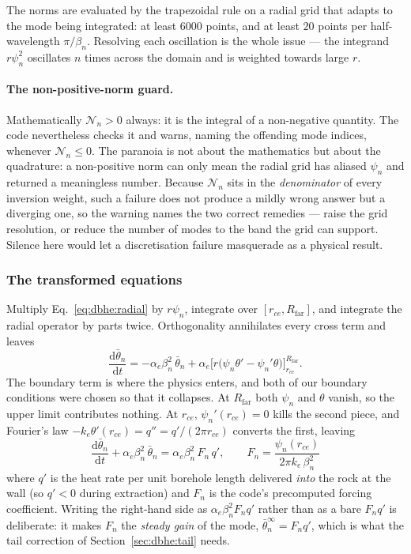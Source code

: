 \documentclass[11pt]{article}
\begin{document}
The norms are evaluated by the trapezoidal rule on a radial grid that adapts to
the mode being integrated: at least $6000$ points, and at least $20$ points per
half-wavelength $\pi/\beta_n$. Resolving each oscillation is the whole issue ---
the integrand $r\psi_n^2$ oscillates $n$ times across the domain and is weighted
towards large $r$.

\paragraph{The non-positive-norm guard.}
Mathematically $\mathcal{N}_n>0$ always: it is the integral of a non-negative
quantity. The code nevertheless checks it and warns, naming the offending mode
indices, whenever $\mathcal{N}_n\le0$. The paranoia is not about the mathematics
but about the quadrature: a non-positive norm can only mean the radial grid has
aliased $\psi_n$ and returned a meaningless number. Because $\mathcal{N}_n$ sits
in the \emph{denominator} of every inversion weight, such a failure does not
produce a mildly wrong answer but a diverging one, so the warning names the two
correct remedies --- raise the grid resolution, or reduce the number of modes to
the band the grid can support. Silence here would let a discretisation failure
masquerade as a physical result.

\subsubsection{The transformed equations}
Multiply Eq.~\eqref{eq:dbhe:radial} by $r\psi_n$, integrate over
$[r_{ce},R_{\mathrm{far}}]$, and integrate the radial operator by parts twice.
Orthogonality annihilates every cross term and leaves
\begin{equation}
\frac{\mathrm{d}\bar\theta_n}{\mathrm{d}t} =-\alpha_e\beta_n^{2}\,\bar\theta_n
+\alpha_e\Big[r\big(\psi_n\theta'-\psi_n'\theta\big)\Big]_{r_{ce}}^{R_{\mathrm{far}}} .
\label{eq:dbhe:proj}
\end{equation}
The boundary term is where the physics enters, and both of our boundary
conditions were chosen so that it collapses. At $R_{\mathrm{far}}$ both
$\psi_n$ and $\theta$ vanish, so the upper limit contributes nothing. At
$r_{ce}$, $\psi_n'(r_{ce})=0$ kills the second piece, and Fourier's law
$-k_e\theta'(r_{ce})=q''=q'/(2\pi r_{ce})$ converts the first, leaving
\begin{equation}
\boxed{\; \frac{\mathrm{d}\bar\theta_n}{\mathrm{d}t}+\alpha_e\beta_n^{2}\,\bar\theta_n
=\alpha_e\beta_n^{2}\,F_n\,q' , \qquad F_n=\frac{\psi_n(r_{ce})}{2\pi k_e\,\beta_n^{2}} \; }
\label{eq:dbhe:modeODE}
\end{equation}
where $q'$ is the heat rate per unit borehole length delivered \emph{into} the
rock at the wall (so $q'<0$ during extraction) and $F_n$ is the code's
precomputed forcing coefficient. Writing the right-hand side as
$\alpha_e\beta_n^2 F_n q'$ rather than as a bare $F_n q'$ is deliberate: it makes
$F_n$ the \emph{steady gain} of the mode, $\bar\theta_n^\infty=F_n q'$, which is
what the tail correction of Section~\ref{sec:dbhe:tail} needs.
\end{document}
